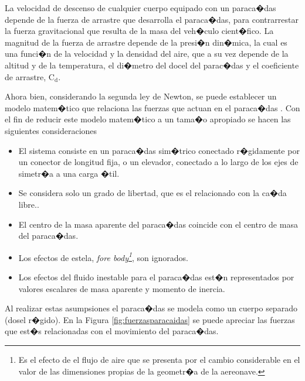 \documentclass[10pt,a4paper]{book}
\begin{document}
La velocidad de descenso de cualquier cuerpo equipado con un paraca�das depende de la fuerza de arrastre que desarrolla el paraca�das, para contrarrestar la fuerza gravitacional que resulta de la masa del veh�culo cient�fico. La magnitud de la fuerza de arrastre depende de la presi�n din�mica, la cual es una funci�n de la velocidad y la densidad del aire, que a su vez depende de la altitud y de la temperatura, el di�metro del docel del parac�das y el coeficiente de arrastre, $\text{C}_{\text{d}}$.

Ahora bien, considerando la segunda ley de Newton, se puede establecer un modelo matem�tico que relaciona las fuerzas que actuan en el paraca�das \cite{ModelParachuteGrande}. Con el fin de reducir este modelo matem�tico a un tama�o apropiado se hacen las siguientes consideraciones
\begin{itemize}
\item El sistema consiste en un paraca�das sim�trico conectado r�gidamente por un conector de longitud fija, o un elevador, conectado a lo largo de los ejes de simetr�a a una carga �til.
\item Se considera solo un grado de libertad, que es el relacionado con la ca�da libre..
\item El centro de la masa aparente del paraca�das coincide con el centro de masa del paraca�das.
\item Los efectos de estela, \textit{fore body\footnote{Es el efecto de el flujo de aire que se presenta por el cambio considerable en el valor de las dimensiones propias de la geometr�a de la aereonave.}},  son ignorados.
\item Los efectos del fluido inestable para el paraca�das est�n representados por valores escalares de masa aparente y momento de inercia.
\end{itemize} 

Al realizar estas asumpsiones el paraca�das se modela como un cuerpo separado (dosel r�gido). En la Figura \ref{fig:fuerzasparacaidas} se puede apreciar las fuerzas que est�s relacionadas con el movimiento del paraca�das.
\end{document}

